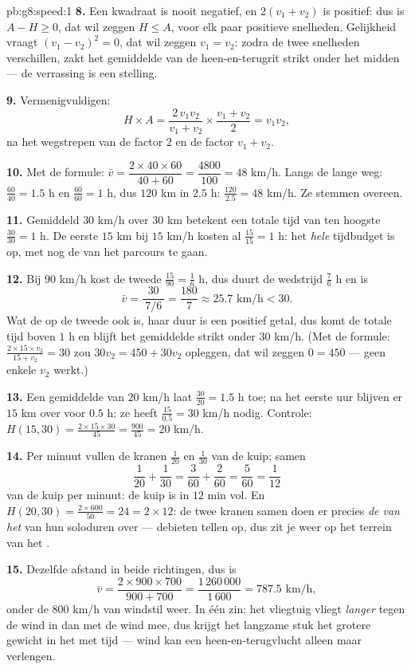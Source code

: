 \begin{solution}{pb:g8:speed:1}
\textbf{8.} Een kwadraat is nooit negatief, en $2(v_1 + v_2)$ is positief: dus is
$A - H \geq 0$, dat wil zeggen $H \leq A$, voor elk paar positieve snelheden.
Gelijkheid vraagt $(v_1 - v_2)^2 = 0$, dat wil zeggen $v_1 = v_2$: zodra de twee
snelheden verschillen, zakt het gemiddelde van de heen-en-terugrit strikt onder
het midden --- de verrassing is een stelling.

\textbf{9.} Vermenigvuldigen:
\[
H \times A
= \frac{2\, v_1 v_2}{v_1 + v_2} \times \frac{v_1 + v_2}{2}
= v_1 v_2 ,
\]
na het wegstrepen van de factor $2$ en de factor $v_1 + v_2$.

\textbf{10.} Met de formule: $\bar v = \dfrac{2 \times 40 \times 60}{40 + 60}
= \dfrac{4800}{100} = 48$ km/h. Langs de lange weg: $\frac{60}{40} = 1.5$ h en
$\frac{60}{60} = 1$ h, dus $120$ km in $2.5$ h: $\frac{120}{2.5} = 48$ km/h. Ze
stemmen overeen.

\textbf{11.} Gemiddeld $30$ km/h over $30$ km betekent een totale tijd van ten
hoogste $\frac{30}{30} = 1$ h. De eerste $15$ km bij $15$ km/h kosten al
$\frac{15}{15} = 1$ h: het \emph{hele} tijdbudget is op, met nog de  van het
parcours te gaan.

\textbf{12.} Bij $90$ km/h kost de tweede  $\frac{15}{90} = \frac16$ h, dus
duurt de wedstrijd $\frac76$ h en is
\[
\bar v = \frac{30}{\ 7/6\ } = \frac{180}{7} \approx 25.7
\text{ km/h} < 30 .
\]
Wat de  op de tweede  ook is, haar duur is een positief getal, dus
komt de totale tijd boven $1$ h en blijft het gemiddelde strikt onder $30$ km/h.
(Met de formule: $\frac{2 \times 15 \times v_2}{15 + v_2} = 30$ zou
$30 v_2 = 450 + 30 v_2$ opleggen, dat wil zeggen $0 = 450$ --- geen enkele
 $v_2$ werkt.)

\textbf{13.} Een gemiddelde van $20$ km/h laat $\frac{30}{20} = 1.5$ h toe; na het
eerste uur blijven er $15$ km over voor $0.5$ h: ze heeft
$\frac{15}{0.5} = 30$ km/h nodig. Controle:
$H(15, 30) = \frac{2 \times 15 \times 30}{45} = \frac{900}{45} = 20$ km/h.

\textbf{14.} Per minuut vullen de kranen $\frac{1}{20}$ en $\frac{1}{30}$ van de
kuip; samen
\[
\frac{1}{20} + \frac{1}{30}
= \frac{3}{60} + \frac{2}{60}
= \frac{5}{60} = \frac{1}{12}
\]
van de kuip per minuut: de kuip is in $12$ min vol. En
$H(20, 30) = \frac{2 \times 600}{50} = 24 = 2 \times 12$: de twee kranen samen
doen er precies \emph{de  van het } van hun soloduren
over --- debieten tellen op, dus zit je weer op het terrein van het .

\textbf{15.} Dezelfde afstand in beide richtingen, dus is
\[
\bar v = \frac{2 \times 900 \times 700}{900 + 700}
= \frac{1\,260\,000}{1\,600} = 787.5 \text{ km/h},
\]
onder de $800$ km/h van windstil weer. In één zin: het vliegtuig vliegt
\emph{langer} tegen de wind in dan met de wind mee, dus krijgt het langzame stuk
het grotere gewicht in het met tijd  --- wind kan een
heen-en-terugvlucht alleen maar verlengen.
\end{solution}
